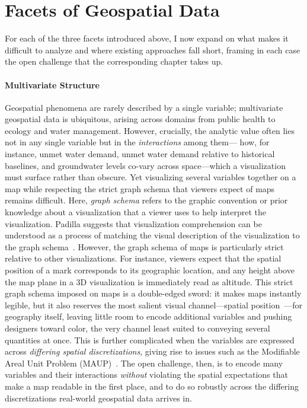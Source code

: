 \section{Facets of Geospatial Data}
%
For each of the three facets introduced above, I now expand on what makes it difficult to analyze and where existing approaches fall short, framing in each case the open challenge that the corresponding chapter takes up.
%
\paragraph{Multivariate Structure}
%
Geospatial phenomena are rarely described by a single variable; multivariate geospatial data is ubiquitous, arising across domains from public health to ecology and water management.
%
However, crucially, the analytic value often lies not in any single variable but in the \emph{interactions} among them--- how, for instance, unmet water demand, unmet water demand relative to historical baselines, and groundwater levels co-vary across space---which a visualization must surface rather than obscure.
%
Yet visualizing several variables together on a map while respecting the strict graph schema that viewers expect of maps~\cite{pinker1990a, hografer2020state} remains difficult.
%
Here, \emph{graph schema} refers to the graphic convention or prior knowledge about a visualization that a viewer uses to help interpret the visualization.
%
Padilla suggests that visualization comprehension can be understood as a process of matching the visual description of the visualization to the graph schema~\cite{padilla_case_2018,padilla_decision_2018}.
%
However, the graph schema of maps is particularly strict relative to other visualizations. 
%
For instance, viewers expect that the spatial position of a mark corresponds to its geographic location, and any height above the map plane in a 3D visualization is immediately read as altitude.
%
This strict graph schema imposed on maps is a double-edged sword: it makes maps instantly legible, but it also reserves the most salient visual channel---spatial position~\cite{Munzner_2015}---for geography itself, leaving little room to encode additional variables and pushing designers toward color, the very channel least suited to conveying several quantities at once.
%
This is further complicated when the variables are expressed across \textit{differing spatial discretizations}, giving rise to issues such as the Modifiable Areal Unit Problem (MAUP)~\cite{fotheringham1991modifiable}.
%
The open challenge, then, is to encode many variables and their interactions \emph{without} violating the spatial expectations that make a map readable in the first place, and to do so robustly across the differing discretizations real-world geospatial data arrives in.

